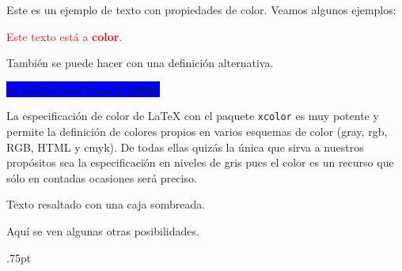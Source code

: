 \documentclass[11pt,a4paper]{article}
\begin{document}
Este es un ejemplo de texto con propiedades de color. Veamos algunos ejemplos:

\textcolor{red}{Este texto está a \textbf{color}.}

También se puede hacer {\color{green} con una definición alternativa.}

\colorbox{blue}{Se pueden crear cajas de {\color{yellow}\textbf{color}}.}

La especificación de color de \LaTeX{} con el paquete \texttt{xcolor} es muy potente y permite la definición de colores propios en varios esquemas de color (gray, rgb, RGB, HTML y cmyk). De todas ellas quizás la única que sirva a nuestros propósitos sea la especificación en niveles de gris pues el color es un recurso que sólo en contadas ocasiones será preciso.

\colorbox{sombra}{Texto resaltado con una caja sombreada.}

\setlength{\fboxrule}{4pt}

\setlength{\fboxrule}{0.5pt} %
\begin{center}
\end{center}



Aquí se ven algunas otras posibilidades.

\newcount\WL \unitlength.75pt
\end{document}
